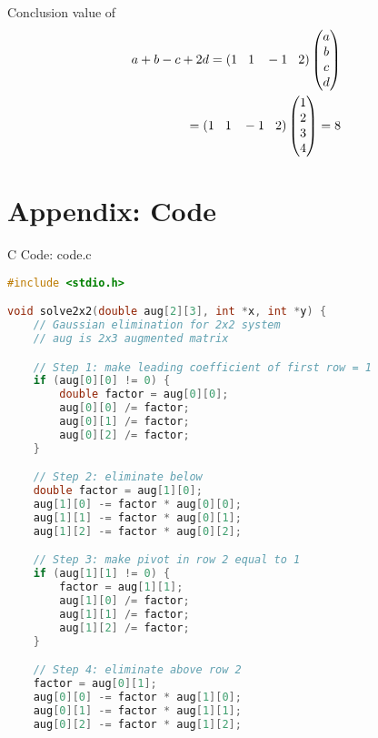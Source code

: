 \documentclass{beamer}
\numberwithin{equation}{section}
\providecommand{\brak}[1]{\ensuremath{\left(#1\right)}}
\theoremstyle{remark}
\newcommand{\myvec}[1]{\ensuremath{\begin{pmatrix}#1\end{pmatrix}}}
\begin{document}
\begin{frame}{Conclusion}
    value of 
    \begin{align}
    a+b-c+2d=    \brak{1\hspace{0.3cm}1\hspace{0.3cm}-1\hspace{0.3cm}2}\myvec{a\\b\\c\\d}\\=\brak{1\hspace{0.3cm}1\hspace{0.3cm}-1\hspace{0.3cm}2}\myvec{1\\2\\3\\4}=8
    \end{align}
    \end{frame}


\section*{Appendix: Code}

\begin{frame}[fragile]{C Code: code.c}
\begin{lstlisting}[language=C]
#include <stdio.h>

void solve2x2(double aug[2][3], int *x, int *y) {
    // Gaussian elimination for 2x2 system
    // aug is 2x3 augmented matrix

    // Step 1: make leading coefficient of first row = 1
    if (aug[0][0] != 0) {
        double factor = aug[0][0];
        aug[0][0] /= factor;
        aug[0][1] /= factor;
        aug[0][2] /= factor;
    }

    // Step 2: eliminate below
    double factor = aug[1][0];
    aug[1][0] -= factor * aug[0][0];
    aug[1][1] -= factor * aug[0][1];
    aug[1][2] -= factor * aug[0][2];

    // Step 3: make pivot in row 2 equal to 1
    if (aug[1][1] != 0) {
        factor = aug[1][1];
        aug[1][0] /= factor;
        aug[1][1] /= factor;
        aug[1][2] /= factor;
    }

    // Step 4: eliminate above row 2
    factor = aug[0][1];
    aug[0][0] -= factor * aug[1][0];
    aug[0][1] -= factor * aug[1][1];
    aug[0][2] -= factor * aug[1][2];
\end{lstlisting}
\end{frame}
\end{document}

